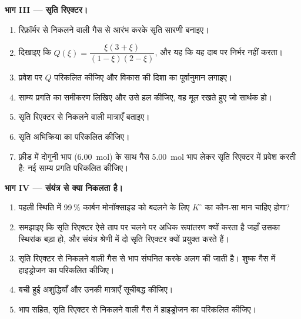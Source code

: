 \begin{problem}
\medskip
\noindent\textbf{भाग III --- सृति रिएक्टर।}
\begin{enumerate}[resume]
  \item रिफ़ॉर्मर से निकलने वाली गैस से आरंभ करके सृति  सारणी बनाइए।
  \item दिखाइए कि $Q(\xi) = \dfrac{\xi(3 + \xi)}{(1 - \xi)(2 - \xi)}$, और
        यह कि यह दाब पर निर्भर नहीं करता।
  \item प्रवेश पर $Q$ परिकलित कीजिए और विकास की दिशा का पूर्वानुमान लगाइए।
  \item साम्य प्रगति का समीकरण लिखिए और उसे हल कीजिए,
        वह मूल रखते हुए जो सार्थक हो।
  \item सृति रिएक्टर से निकलने वाली मात्राएँ बताइए।
  \item सृति अभिक्रिया का  परिकलित कीजिए।
  \item फ़ीड में दोगुनी भाप (\qty{6.00}{mol}) के साथ गैस
        \qty{5.00}{mol} भाप लेकर सृति रिएक्टर में प्रवेश करती है: नई
        साम्य प्रगति परिकलित कीजिए।
\end{enumerate}

\medskip
\noindent\textbf{भाग IV --- संयंत्र से क्या निकलता है।}
\begin{enumerate}[resume]
  \item पहली स्थिति में 99\,\% कार्बन मोनॉक्साइड को बदलने के लिए
        $K^\circ$ का कौन-सा मान चाहिए होगा?
  \item समझाइए कि सृति रिएक्टर ऐसे ताप पर चलने पर अधिक रूपांतरण क्यों करता है
        जहाँ उसका स्थिरांक बड़ा हो, और संयंत्र श्रेणी में दो
        सृति रिएक्टर क्यों प्रयुक्त करते हैं।
  \item सृति रिएक्टर से निकलने वाली गैस से भाप संघनित करके अलग की जाती है।
        शुष्क गैस में हाइड्रोजन का  परिकलित कीजिए।
  \item बची हुई अशुद्धियाँ और उनकी मात्राएँ सूचीबद्ध कीजिए।
  \item भाप सहित, सृति रिएक्टर से निकलने वाली गैस में हाइड्रोजन का 
        परिकलित कीजिए।
\end{enumerate}
\end{problem}
